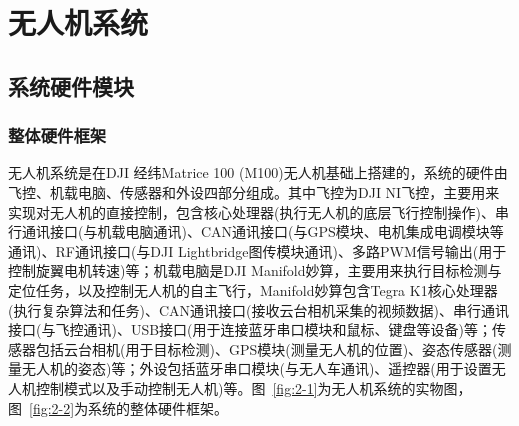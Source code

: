 
\chapter{无人机系统}
\section{系统硬件模块}
\subsection{整体硬件框架}
无人机系统是在DJI 经纬Matrice 100 (M100)无人机基础上搭建的，系统的硬件由飞控、机载电脑、传感器和外设四部分组成。其中飞控为DJI NI飞控，主要用来实现对无人机的直接控制，包含核心处理器(执行无人机的底层飞行控制操作)、串行通讯接口(与机载电脑通讯)、CAN通讯接口(与GPS模块、电机集成电调模块等通讯)、RF通讯接口(与DJI Lightbridge图传模块通讯)、多路PWM信号输出(用于控制旋翼电机转速)等；机载电脑是DJI Manifold妙算，主要用来执行目标检测与定位任务，以及控制无人机的自主飞行，Manifold妙算包含Tegra K1核心处理器(执行复杂算法和任务)、CAN通讯接口(接收云台相机采集的视频数据)、串行通讯接口(与飞控通讯)、USB接口(用于连接蓝牙串口模块和鼠标、键盘等设备)等；传感器包括云台相机(用于目标检测)、GPS模块(测量无人机的位置)、姿态传感器(测量无人机的姿态)等；外设包括蓝牙串口模块(与无人车通讯)、遥控器(用于设置无人机控制模式以及手动控制无人机)等。图~\ref{fig:2-1}为无人机系统的实物图，图~\ref{fig:2-2}为系统的整体硬件框架。

